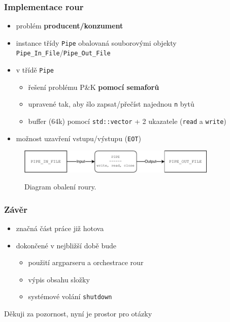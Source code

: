 \documentclass[xcolor=dvipsnames]{beamer}
\begin{document}
\begin{frame}
\frametitle{Implementace rour}
    \begin{itemize}
        \item problém \textbf{producent/konzument}
        \item instance třídy \texttt{Pipe} obalovaná souborovými objekty \texttt{Pipe\_In\_File}/\texttt{Pipe\_Out\_File}
        \item v třídě \texttt{Pipe}
        \begin{itemize}
            \item řešení problému P\&K \textbf{pomocí semaforů}
            \item upravené tak, aby šlo zapsat/přečíst najednou \texttt{n} bytů
            \item buffer (64k) pomocí \texttt{std::vector} + 2 ukazatele (\texttt{read} a \texttt{write})
        \end{itemize}
        \item možnost uzavření vstupu/výstupu (\texttt{EOT}) 
    \end{itemize}
    \begin{figure}[!ht]
    \centering
    {\includegraphics[width=0.85\textwidth]{pdf/pipe.pdf}}
    \caption{Diagram obalení roury.}
    \label{fig:screen-transition-diagram}
    \end{figure}
\end{frame}


\begin{frame}
\frametitle{Závěr}
    \begin{itemize}
        \item značná část práce již hotova 
        \item dokončené v nejbližší době bude
        \begin{itemize}
            \item použití argparseru a orchestrace rour
            \item výpis obsahu složky 
            \item systémové volání  \texttt{shutdown}
        \end{itemize}
    \end{itemize}
\end{frame}

\begin{frame}
\center
Děkuji za pozornost,
nyní je prostor pro otázky
\end{frame}
\end{document}
